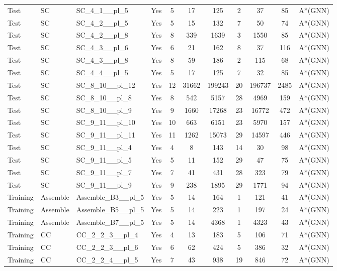 \documentclass{article}
\begin{document}
\begin{tabular}{lllcccccccc}
Test & SC & SC\_4\_1\_\_pl\_5 & Yes & 5 & 17 & 125 & 2 & 37 & 85 & A*(GNN) \\
Test & SC & SC\_4\_2\_\_pl\_5 & Yes & 5 & 15 & 132 & 7 & 50 & 74 & A*(GNN) \\
Test & SC & SC\_4\_2\_\_pl\_8 & Yes & 8 & 339 & 1639 & 3 & 1550 & 85 & A*(GNN) \\
Test & SC & SC\_4\_3\_\_pl\_6 & Yes & 6 & 21 & 162 & 8 & 37 & 116 & A*(GNN) \\
Test & SC & SC\_4\_3\_\_pl\_8 & Yes & 8 & 59 & 186 & 2 & 115 & 68 & A*(GNN) \\
Test & SC & SC\_4\_4\_\_pl\_5 & Yes & 5 & 17 & 125 & 7 & 32 & 85 & A*(GNN) \\
Test & SC & SC\_8\_10\_\_pl\_12 & Yes & 12 & 31662 & 199243 & 20 & 196737 & 2485 & A*(GNN) \\
Test & SC & SC\_8\_10\_\_pl\_8 & Yes & 8 & 542 & 5157 & 28 & 4969 & 159 & A*(GNN) \\
Test & SC & SC\_8\_10\_\_pl\_9 & Yes & 9 & 1660 & 17268 & 23 & 16772 & 472 & A*(GNN) \\
Test & SC & SC\_9\_11\_\_pl\_10 & Yes & 10 & 663 & 6151 & 23 & 5970 & 157 & A*(GNN) \\
Test & SC & SC\_9\_11\_\_pl\_11 & Yes & 11 & 1262 & 15073 & 29 & 14597 & 446 & A*(GNN) \\
Test & SC & SC\_9\_11\_\_pl\_4 & Yes & 4 & 8 & 143 & 14 & 30 & 98 & A*(GNN) \\
Test & SC & SC\_9\_11\_\_pl\_5 & Yes & 5 & 11 & 152 & 29 & 47 & 75 & A*(GNN) \\
Test & SC & SC\_9\_11\_\_pl\_7 & Yes & 7 & 41 & 431 & 28 & 323 & 79 & A*(GNN) \\
Test & SC & SC\_9\_11\_\_pl\_9 & Yes & 9 & 238 & 1895 & 29 & 1771 & 94 & A*(GNN) \\
Training & Assemble & Assemble\_B3\_\_pl\_5 & Yes & 5 & 14 & 164 & 1 & 121 & 41 & A*(GNN) \\
Training & Assemble & Assemble\_B5\_\_pl\_5 & Yes & 5 & 14 & 223 & 1 & 197 & 24 & A*(GNN) \\
Training & Assemble & Assemble\_B7\_\_pl\_5 & Yes & 5 & 14 & 4368 & 1 & 4323 & 43 & A*(GNN) \\
Training & CC & CC\_2\_2\_3\_\_pl\_4 & Yes & 4 & 13 & 183 & 5 & 106 & 71 & A*(GNN) \\
Training & CC & CC\_2\_2\_3\_\_pl\_6 & Yes & 6 & 62 & 424 & 5 & 386 & 32 & A*(GNN) \\
Training & CC & CC\_2\_2\_4\_\_pl\_5 & Yes & 7 & 43 & 938 & 19 & 846 & 72 & A*(GNN) \\

\end{tabular}
\end{document}
